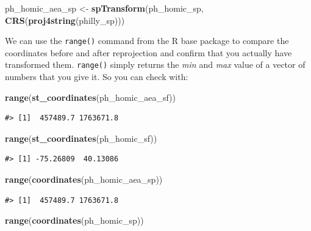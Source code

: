\documentclass[]{book}
\newenvironment{Shaded}{\begin{snugshade}}{\end{snugshade}}
\newcommand{\KeywordTok}[1]{\textcolor[rgb]{0.13,0.29,0.53}{\textbf{#1}}}
\newcommand{\StringTok}[1]{\textcolor[rgb]{0.31,0.60,0.02}{#1}}
\newcommand{\NormalTok}[1]{#1}
\theoremstyle{definition}
\theoremstyle{definition}
\theoremstyle{definition}
\theoremstyle{remark}
\begin{document}
\begin{Shaded}
\begin{Highlighting}[]
\NormalTok{ph_homic_aea_sp <-}\StringTok{ }\KeywordTok{spTransform}\NormalTok{(ph_homic_sp, }\KeywordTok{CRS}\NormalTok{(}\KeywordTok{proj4string}\NormalTok{(philly_sp)))}
\end{Highlighting}
\end{Shaded}

We can use the \texttt{range()} command from the R base package to
compare the coordinates before and after reprojection and confirm that
you actually have transformed them. \texttt{range()} simply returns the
\emph{min} and \emph{max} value of a vector of numbers that you give it.
So you can check with:

\begin{Shaded}
\begin{Highlighting}[]
\KeywordTok{range}\NormalTok{(}\KeywordTok{st_coordinates}\NormalTok{(ph_homic_aea_sf))}
\end{Highlighting}
\end{Shaded}

\begin{verbatim}
#> [1]  457489.7 1763671.8
\end{verbatim}

\begin{Shaded}
\begin{Highlighting}[]
\KeywordTok{range}\NormalTok{(}\KeywordTok{st_coordinates}\NormalTok{(ph_homic_sf))}
\end{Highlighting}
\end{Shaded}

\begin{verbatim}
#> [1] -75.26809  40.13086
\end{verbatim}

\begin{Shaded}
\begin{Highlighting}[]
\KeywordTok{range}\NormalTok{(}\KeywordTok{coordinates}\NormalTok{(ph_homic_aea_sp))}
\end{Highlighting}
\end{Shaded}

\begin{verbatim}
#> [1]  457489.7 1763671.8
\end{verbatim}

\begin{Shaded}
\begin{Highlighting}[]
\KeywordTok{range}\NormalTok{(}\KeywordTok{coordinates}\NormalTok{(ph_homic_sp))}
\end{Highlighting}
\end{Shaded}
\end{document}
